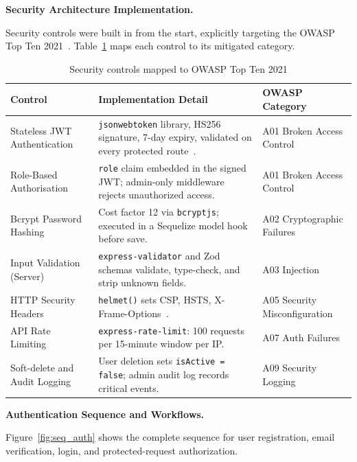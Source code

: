 \textbf{Security Architecture Implementation.}

Security controls were built in from the start, explicitly targeting the OWASP Top Ten 2021~\cite{owasp2021}. Table~\ref{tab:security} maps each control to its mitigated category.

\begin{table}[H]
  \centering
  \begin{tabularx}{\linewidth}{>{\raggedright\arraybackslash}p{3.5cm} X >{\raggedright\arraybackslash}p{3.5cm}}
    \toprule
    \textbf{Control} & \textbf{Implementation Detail} & \textbf{OWASP Category} \\
    \midrule
    Stateless JWT Authentication  & \texttt{jsonwebtoken} library, HS256 signature, 7-day expiry, validated on every protected route~\cite{jwt2015}. & A01 Broken Access Control \\
    \addlinespace
    Role-Based Authorisation & \texttt{role} claim embedded in the signed JWT; admin-only middleware rejects unauthorized access. & A01 Broken Access Control \\
    \addlinespace
    Bcrypt Password Hashing   & Cost factor 12 via \texttt{bcryptjs}; executed in a Sequelize model hook before save. & A02 Cryptographic Failures \\
    \addlinespace
    Input Validation (Server) & \texttt{express-validator} and Zod schemas validate, type-check, and strip unknown fields. & A03 Injection \\
    \addlinespace
    HTTP Security Headers     & \texttt{helmet()} sets CSP, HSTS, X-Frame-Options~\cite{helmet2023}. & A05 Security Misconfiguration \\
    \addlinespace
    API Rate Limiting   & \texttt{express-rate-limit}: 100 requests per 15-minute window per IP. & A07 Auth Failures \\
    \addlinespace
    Soft-delete and Audit Logging & User deletion sets \texttt{isActive = false}; admin audit log records critical events. & A09 Security Logging \\
    \bottomrule
  \end{tabularx}
    \small
  \caption{Security controls mapped to OWASP Top Ten 2021}
  \label{tab:security}
\end{table}

\textbf{Authentication Sequence and Workflows.}

Figure~\ref{fig:seq_auth} shows the complete sequence for user registration, email verification, login, and protected-request authorization.

